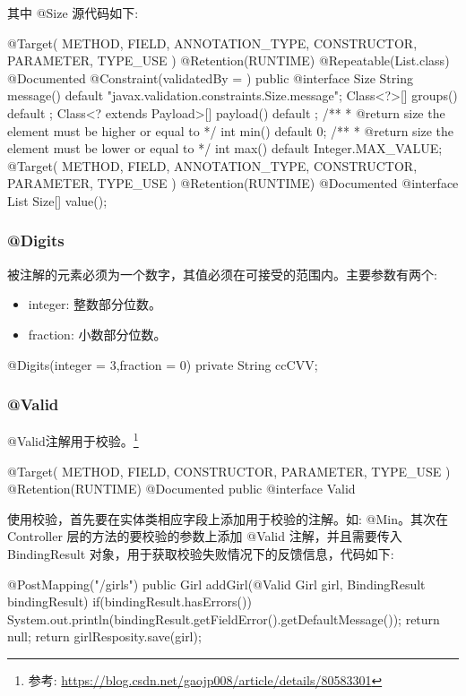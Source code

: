 其中 @Size 源代码如下:
\begin{Java}
@Target({ METHOD, FIELD, ANNOTATION_TYPE, CONSTRUCTOR, PARAMETER, TYPE_USE })
@Retention(RUNTIME)
@Repeatable(List.class)
@Documented
@Constraint(validatedBy = { })
public @interface Size {
    String message() default "{javax.validation.constraints.Size.message}";
    Class<?>[] groups() default { };
    Class<? extends Payload>[] payload() default { };
    /**
     * @return size the element must be higher or equal to
     */
    int min() default 0;
    /**
     * @return size the element must be lower or equal to
     */
    int max() default Integer.MAX_VALUE;
    @Target({ METHOD, FIELD, ANNOTATION_TYPE, CONSTRUCTOR, PARAMETER, TYPE_USE })
    @Retention(RUNTIME)
    @Documented
    @interface List {
        Size[] value();
    }
}
\end{Java}

\subsubsection{@Digits}

被注解的元素必须为一个数字，其值必须在可接受的范围内。主要参数有两个:
\begin{itemize}
    \item integer: 整数部分位数。
    \item fraction: 小数部分位数。
\end{itemize}

\begin{Java}
@Digits(integer = 3,fraction = 0)
private String ccCVV;
\end{Java}

\subsubsection{@Valid}

@Valid注解用于校验。\footnote{参考: \url{https://blog.csdn.net/gaojp008/article/details/80583301}}

\begin{Java}
@Target({ METHOD, FIELD, CONSTRUCTOR, PARAMETER, TYPE_USE })
@Retention(RUNTIME)
@Documented
public @interface Valid {
}
\end{Java}

使用校验，首先要在实体类相应字段上添加用于校验的注解。如: @Min。其次在 Controller 层的方法的要校验的参数上添加 @Valid 注解，并且需要传入 BindingResult 对象，用于获取校验失败情况下的反馈信息，代码如下:

\begin{Java}
@PostMapping("/girls")  
public Girl addGirl(@Valid Girl girl, BindingResult bindingResult) {  
    if(bindingResult.hasErrors()){  
        System.out.println(bindingResult.getFieldError().getDefaultMessage());  
        return null;  
    }  
    return girlResposity.save(girl);  
}
\end{Java}

\newpage